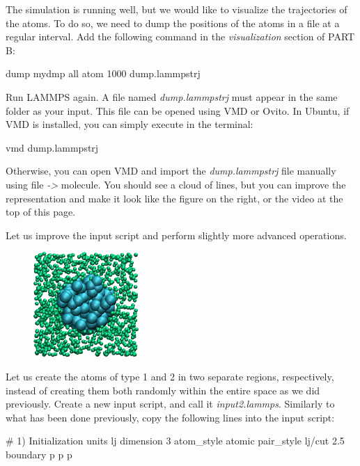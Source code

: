 The simulation is running well, but we would like to
visualize the trajectories of the atoms. To do so, we need
to dump the positions of the atoms in a file at a regular
interval. Add the following command in the \textit{visualization}
section of PART B:

\begin{lcverbatim}
dump mydmp all atom 1000 dump.lammpstrj
\end{lcverbatim}

\noindent Run LAMMPS again. A file named \textit{dump.lammpstrj} must appear in
the same folder as your input. This file can be opened using
VMD or Ovito. In Ubuntu, if VMD is installed, you can simply
execute in the terminal:

\begin{lcverbatim}
vmd dump.lammpstrj
\end{lcverbatim}

\noindent Otherwise, you can open VMD and import the \textit{dump.lammpstrj}
file manually using file \textit{->} molecule. You should see a cloud
of lines, but you can improve the representation and make it
look like the figure on the right, or the video at the 
top of this page. 

Let us improve the input script and perform slightly more
advanced operations.

\begin{figure}
\begin{center}
\includegraphics[width=4cm]{tutorials/level0/lennard-jones-fluid/input2.png}
\end{center}
\end{figure}

Let us create the atoms of type 1 and 2 in two separate
regions, respectively, instead of creating them both randomly 
within the entire space as we did previously. Create a new input script, and call
it \textit{input2.lammps}. Similarly to what has been done previously, copy the following lines
into the input script:

\begin{lcverbatim}
# 1) Initialization
units lj
dimension 3
atom_style atomic
pair_style lj/cut 2.5
boundary p p p
\end{lcverbatim}


